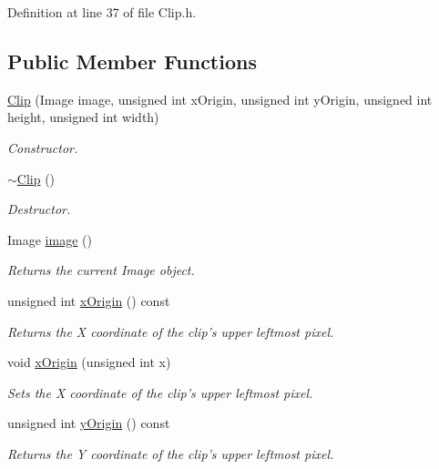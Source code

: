 Definition at line 37 of file Clip.h.\subsection*{Public Member Functions}
\begin{CompactItemize}
\item 
\hyperlink{class_clip_f8f4312cce2d38d61ce370912e9e7e4a}{Clip} (Image image, unsigned int xOrigin, unsigned int yOrigin, unsigned int height, unsigned int width)
\begin{CompactList}\small\item\em Constructor. \item\end{CompactList}\item 
\hyperlink{class_clip_88647ed65e3482b5e0533ec98667b0fa}{$\sim$Clip} ()
\begin{CompactList}\small\item\em Destructor. \item\end{CompactList}\item 
Image \hyperlink{class_clip_f4500103f1babcf2b9283eaffc6af96a}{image} ()
\begin{CompactList}\small\item\em Returns the current Image object. \item\end{CompactList}\item 
unsigned int \hyperlink{class_clip_6965fb65870eeb239c8a829444bb4ed7}{xOrigin} () const 
\begin{CompactList}\small\item\em Returns the X coordinate of the clip's upper leftmost pixel. \item\end{CompactList}\item 
void \hyperlink{class_clip_59bed794f674858a9ca02fce36c58fac}{xOrigin} (unsigned int x)
\begin{CompactList}\small\item\em Sets the X coordinate of the clip's upper leftmost pixel. \item\end{CompactList}\item 
unsigned int \hyperlink{class_clip_6023296db25d263b311900cafb7cc55d}{yOrigin} () const 
\begin{CompactList}\small\item\em Returns the Y coordinate of the clip's upper leftmost pixel. \item\end{CompactList}\item 

\end{CompactItemize}
